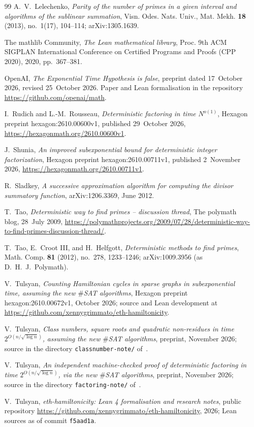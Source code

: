 \documentclass[10pt]{amsart}
\theoremstyle{plain}
\theoremstyle{definition}
\theoremstyle{remark}
\numberwithin{equation}{section}
\begin{document}
\begin{thebibliography}{99}
A.~V.~Lelechenko, \emph{Parity of the number of primes in a given interval and algorithms of the
sublinear summation}, Visn. Odes. Nats. Univ., Mat. Mekh. \textbf{18} (2013), no.~1(17), 104--114;
arXiv:1305.1639.

The mathlib Community, \emph{The {L}ean mathematical library}, Proc. 9th ACM SIGPLAN International
Conference on Certified Programs and Proofs (CPP 2020), 2020, pp.~367--381.

OpenAI, \emph{The {E}xponential {T}ime {H}ypothesis is false}, preprint dated 17~October 2026, revised
25~October 2026. Paper and Lean formalisation in the repository \url{https://github.com/openai/math}.

I.~Rudich and L.-M.~Rousseau, \emph{Deterministic factoring in time $N^{o(1)}$}, Hexagon preprint
hexagon:2610.00600v1, published 29~October 2026, \url{https://hexagonmath.org/2610.00600v1}.

J.~Shunia, \emph{An improved subexponential bound for deterministic integer factorization}, Hexagon
preprint hexagon:2610.00711v1, published 2~November 2026, \url{https://hexagonmath.org/2610.00711v1}.

R.~Sladkey, \emph{A successive approximation algorithm for computing the divisor summatory function},
arXiv:1206.3369, June 2012.

T.~Tao, \emph{Deterministic way to find primes -- discussion thread}, The polymath blog, 28~July 2009,
\url{https://polymathprojects.org/2009/07/28/deterministic-way-to-find-primes-discussion-thread/}.

T.~Tao, E.~Croot III, and H.~Helfgott, \emph{Deterministic methods to find primes}, Math. Comp.
\textbf{81} (2012), no.~278, 1233--1246; arXiv:1009.3956 (as D.~H.~J.~Polymath).

V.~Tulsyan, \emph{Counting {H}amiltonian cycles in sparse graphs in subexponential time, assuming the
new $\#${SAT} algorithms}, Hexagon preprint hexagon:2610.00672v1, October 2026; source and Lean
development at \url{https://github.com/xennygrimmato/eth-hamiltonicity}.

V.~Tulsyan, \emph{Class numbers, square roots and quadratic non-residues in time
$2^{O(n/\sqrt{\log n})}$, assuming the new $\#${SAT} algorithms}, preprint, November 2026; source in the
directory \texttt{classnumber-note/} of~\cite{TulsyanRepo26}.

V.~Tulsyan, \emph{An independent machine-checked proof of deterministic factoring in time
$2^{O(n/\sqrt{\log n})}$, via the new $\#${SAT} algorithms}, preprint, November 2026; source in the
directory \texttt{factoring-note/} of~\cite{TulsyanRepo26}.

V.~Tulsyan, \emph{eth-hamiltonicity: {L}ean 4 formalisation and research notes}, public repository
\url{https://github.com/xennygrimmato/eth-hamiltonicity}, 2026; Lean sources as of commit \texttt{f5aad1a}.

\end{thebibliography}
\end{document}
